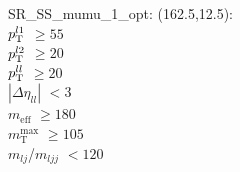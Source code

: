 SR\_SS\_mumu\_1\_opt: (162.5,12.5): \\
$p_{\text{T}}^{l1}$ $\geq 55$ \\
$p_{\text{T}}^{l2}$ $\geq 20$ \\
$p_{\text{T}}^{ll}$ $\geq 20$ \\
$|\Delta\eta_{ll}|$ $<3$ \\
$m_{\text{eff}}$ $\geq 180$ \\
$m_{\text{T}}^{\text{max}}$ $\geq 105$ \\
$m_{lj}$/$m_{ljj}$ $<120$ \\
